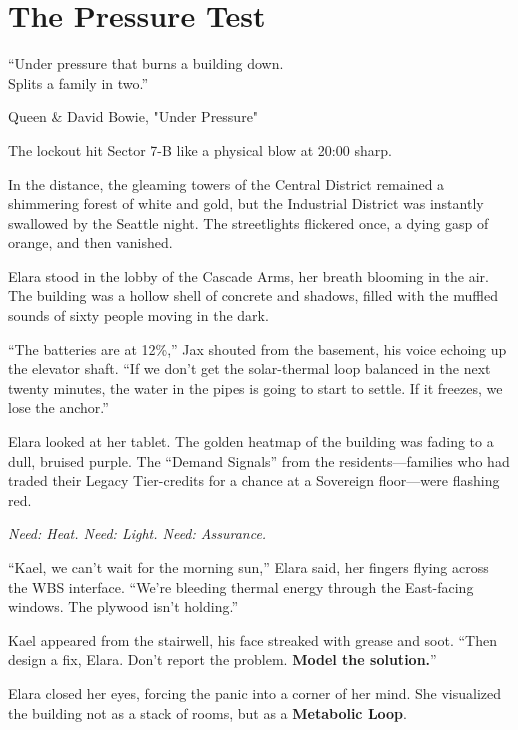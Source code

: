 
\chapter{The Pressure Test}
\epigraph{``Under pressure that burns a building down.\\Splits a family in two.''}{Queen \& David Bowie, "Under Pressure"}

The lockout hit Sector 7-B like a physical blow at 20:00 sharp. 

In the distance, the gleaming towers of the Central District remained a shimmering forest of white and gold, but the Industrial District was instantly swallowed by the Seattle night. The streetlights flickered once, a dying gasp of orange, and then vanished. 

Elara stood in the lobby of the Cascade Arms, her breath blooming in the air. The building was a hollow shell of concrete and shadows, filled with the muffled sounds of sixty people moving in the dark. 


``The batteries are at 12\%,'' Jax shouted from the basement, his voice echoing up the elevator shaft. ``If we don't get the solar-thermal loop balanced in the next twenty minutes, the water in the pipes is going to start to settle. If it freezes, we lose the anchor.''

Elara looked at her tablet. The golden heatmap of the building was fading to a dull, bruised purple. The ``Demand Signals'' from the residents—families who had traded their Legacy Tier-credits for a chance at a Sovereign floor—were flashing red. 

\textit{Need: Heat. Need: Light. Need: Assurance.}

``Kael, we can't wait for the morning sun,'' Elara said, her fingers flying across the WBS interface. ``We’re bleeding thermal energy through the East-facing windows. The plywood isn't holding.''

Kael appeared from the stairwell, his face streaked with grease and soot. ``Then design a fix, Elara. Don't report the problem. \textbf{Model the solution.}''



Elara closed her eyes, forcing the panic into a corner of her mind. She visualized the building not as a stack of rooms, but as a \textbf{Metabolic Loop}. 

